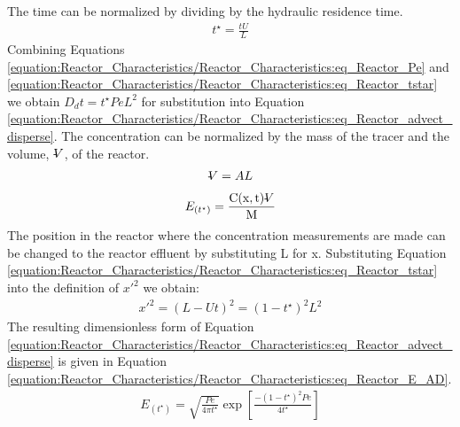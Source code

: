 \documentclass[letterpaper,10pt,english]{sphinxmanual}
\begin{document}
The time can be normalized by dividing by the hydraulic residence time.
\begin{equation}\label{equation:Reactor_Characteristics/Reactor_Characteristics:eq_Reactor_tstar}
\begin{split} t^{\star} =\frac{tU}{L}\end{split}
\end{equation}
Combining Equations \eqref{equation:Reactor_Characteristics/Reactor_Characteristics:eq_Reactor_Pe} and \eqref{equation:Reactor_Characteristics/Reactor_Characteristics:eq_Reactor_tstar} we obtain \(D_{d} t=t^{\star} PeL^{2}\) for substitution into Equation \eqref{equation:Reactor_Characteristics/Reactor_Characteristics:eq_Reactor_advect_disperse}. The concentration can be normalized by the mass of the tracer and the volume, \(\rlap{-} V\), of the reactor.
\begin{equation}\label{equation:Reactor_Characteristics/Reactor_Characteristics:Reactor_Characteristics/Reactor_Characteristics:5}
\begin{split}\rlap{-} V =AL\end{split}
\end{equation}\begin{equation}\label{equation:Reactor_Characteristics/Reactor_Characteristics:Reactor_Characteristics/Reactor_Characteristics:6}
\begin{split}E_{\left(t^{\star} \right)} =\frac{{\rm C(x,t)}\rlap{-} V }{{\rm M}}\end{split}
\end{equation}
The position in the reactor where the concentration measurements are made can be changed to the reactor effluent by substituting L for x. Substituting Equation \eqref{equation:Reactor_Characteristics/Reactor_Characteristics:eq_Reactor_tstar} into the definition of \(x'^{2}\) we obtain:
\begin{equation}\label{equation:Reactor_Characteristics/Reactor_Characteristics:Reactor_Characteristics/Reactor_Characteristics:7}
\begin{split}x'^{2} =\left(L-Ut\right)^{2} =\left(1-t^{\star} \right)^{2} L^{2}\end{split}
\end{equation}
The resulting dimensionless form of Equation \eqref{equation:Reactor_Characteristics/Reactor_Characteristics:eq_Reactor_advect_disperse} is given in Equation \eqref{equation:Reactor_Characteristics/Reactor_Characteristics:eq_Reactor_E_AD}.
\begin{equation}\label{equation:Reactor_Characteristics/Reactor_Characteristics:eq_Reactor_E_AD}
\begin{split} E_{\left(t^{\star} \right)} =\sqrt{\frac{Pe}{4\pi t^{\star} } } \exp \left[\frac{-\left(1-t^{\star} \right)^{2} Pe}{4t^{\star} } \right]\end{split}
\end{equation}
\end{document}
